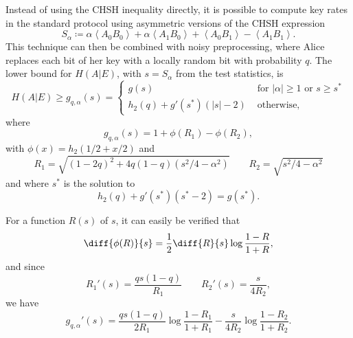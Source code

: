 \documentclass[10pt, a4paper]{article}
\numberwithin{equation}{section} %
\theoremstyle{definition}
\theoremstyle{plain}
\newcommand{\abs}[1]{\left\lvert#1\right\rvert}
\newcommand{\?}{\mathrel{?}} %
\newcommand{\angleb}[1]{\left\langle #1 \right\rangle} %
\begin{document}
      Instead of using the CHSH inequality directly, it is possible to compute key rates in the standard protocol using asymmetric versions of the CHSH expression
      \begin{equation}
        S_{\alpha} \coloneqq \alpha\angleb{A_0 B_0} + \alpha\angleb{A_1 B_0} + \angleb{A_0 B_1} - \angleb{A_1 B_1}.
      \end{equation}
      This technique can then be combined with noisy preprocessing, where Alice replaces each bit of her key with a locally random bit with probability \(q\). The lower bound for \(H(A|E)\), with \(s = S_{\alpha}\) from the test statistics, is
      \begin{equation} H(A|E) \geq g_{q,\alpha}(s) = \begin{cases}
        g(s) & \text{ for } \abs{\alpha} \geq 1 \text{ or } s \geq s^* \\
        h_2(q) + g'(s^*)(\abs{s}-2) & \text{ otherwise},
      \end{cases}
    \end{equation}
    where
    \begin{equation}
      g_{q,\alpha}(s) = 1 + \phi\left(R_1\right) - \phi\left(R_2\right),
    \end{equation}
    with \(\phi(x) = h_2(1/2 + x/2)\) and
    \begin{equation} 
      R_1 = \sqrt{{(1-2q)}^2 + 4q(1-q)(s^2/4-\alpha^2)} \qquad R_2 = \sqrt{s^2/4-\alpha^2}
    \end{equation}
    and where \(s^*\) is the solution to
    \begin{equation}\label{eqn:sstar}
      h_2(q) + g'(s^*) (s^*-2) = g(s^*).
    \end{equation}

    For a function \(R(s)\) of \(s\), it can easily be verified that
    \begin{equation}
      \diff{\phi(R)}{s} = \frac{1}{2} \diff{R}{s} \log\frac{1-R}{1+R},
    \end{equation}
    and since
    \begin{equation} 
      R_1'(s) = \frac{qs(1-q)}{R_1} \qquad R_2'(s) = \frac{s}{4R_2},
    \end{equation}
    we have
    \begin{equation}\label{eqn:diffg}
      g_{q,\alpha}'(s) = \frac{qs(1-q)}{2R_1} \log\frac{1-R_1}{1+R_1} - \frac{s}{4R_2} \log\frac{1-R_2}{1+R_2}.
    \end{equation}
\end{document}
